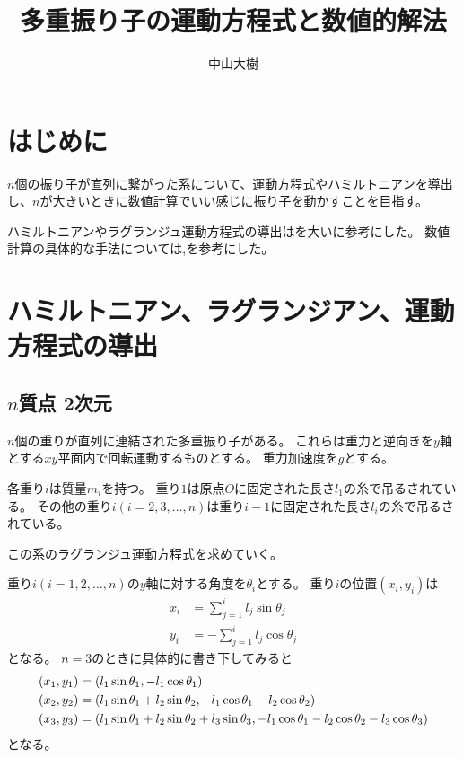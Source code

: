 \documentclass{jsarticle}
\title{多重振り子の運動方程式と数値的解法}
\author{中山大樹}
\newcommand{\eqa}[1]{\begin{align}#1\end{align}}
\begin{document}
\maketitle

\section{はじめに}

$n$個の振り子が直列に繋がった系について、運動方程式やハミルトニアンを導出し、$n$が大きいときに数値計算でいい感じに振り子を動かすことを目指す。

ハミルトニアンやラグランジュ運動方程式の導出は\cite{カオス人形のしくみ}を大いに参考にした。
数値計算の具体的な手法については\cite{システム数理IV},\cite{陰的RUNGE-KUTTA法}を参考にした。

\section{ハミルトニアン、ラグランジアン、運動方程式の導出}

\subsection{$n$質点 2次元}

$n$個の重りが直列に連結された多重振り子がある。
これらは重力と逆向きを$y$軸とする$xy$平面内で回転運動するものとする。
重力加速度を$g$とする。

各重り$i$は質量$m_i$を持つ。
重り$1$は原点$O$に固定された長さ$l_1$の糸で吊るされている。
その他の重り$i(i=2,3,\dots,n)$は重り$i-1$に固定された長さ$l_i$の糸で吊るされている。

この系のラグランジュ運動方程式を求めていく。

重り$i(i=1,2,\dots,n)$の$y$軸に対する角度を$\theta_i$とする。
重り$i$の位置$(x_i, y_i)$は
\eqa{
	x_i &= \sum_{j=1}^i l_j \sin\theta_j \\
	y_i &= -\sum_{j=1}^i l_j \cos\theta_j
}
となる。
$n=3$のときに具体的に書き下してみると
\eqa{
	\left(x_1, y_1\right) &= \left(l_1 \sin\theta_1, -l_1 \cos\theta_1\right) \notag\\
	\left(x_2, y_2\right) &= \left(l_1 \sin\theta_1 + l_2 \sin\theta_2, -l_1 \cos\theta_1 - l_2 \cos\theta_2\right) \notag\\
	\left(x_3, y_3\right) &= \left(
		l_1 \sin\theta_1 + l_2 \sin\theta_2 + l_3 \sin\theta_3,
		-l_1 \cos\theta_1 - l_2 \cos\theta_2 - l_3 \cos\theta_3
		\right) \notag
}
となる。
\end{document}
